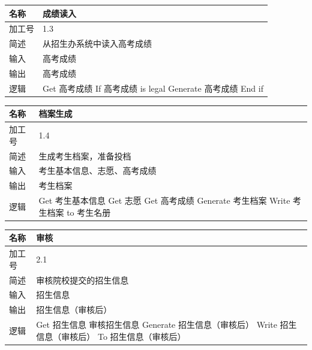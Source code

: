 \documentclass[CJK,utf8]{ctexrep}
\begin{document}
\begin{tabularx}{0.85\textwidth}{|l|X|}
	\hline
	\textbf{名称} & \textbf{成绩读入} \\
	\hline
	加工号 & 1.3 \\
	\hline
	简述 & 从招生办系统中读入高考成绩 \\
	\hline
	输入 & 高考成绩 \\
	\hline
	输出 & 高考成绩 \\
	\hline
	\multirow{4}{*}{逻辑} & \ttfamily
	Get 高考成绩 \newline
	If 高考成绩 is legal \newline
	Generate 高考成绩 \newline
	End if \\
	\hline
\end{tabularx}

\begin{tabularx}{0.85\textwidth}{|l|X|}
	\hline
	\textbf{名称} & \textbf{档案生成} \\
	\hline
	加工号 & 1.4 \\
	\hline
	简述 & 生成考生档案，准备投档 \\
	\hline
	输入 & 考生基本信息、志愿、高考成绩 \\
	\hline
	输出 & 考生档案 \\
	\hline
	\multirow{5}{*}{逻辑} & \ttfamily
	Get 考生基本信息 \newline
	Get 志愿 \newline
	Get 高考成绩 \newline
	Generate 考生档案 \newline
	Write 考生档案 to 考生名册 \\
	\hline
\end{tabularx}

\begin{tabularx}{0.85\textwidth}{|l|X|}
	\hline
	\textbf{名称} & \textbf{审核} \\
	\hline
	加工号 & 2.1 \\
	\hline
	简述 & 审核院校提交的招生信息 \\
	\hline
	输入 & 招生信息 \\
	\hline
	输出 & 招生信息（审核后） \\
	\hline
	\multirow{4}{*}{逻辑} & \ttfamily
	Get 招生信息 \newline
	审核招生信息 \newline
	Generate 招生信息（审核后） \newline
	Write 招生信息（审核后） To 招生信息（审核后） \\
	\hline
\end{tabularx}
\end{document}
